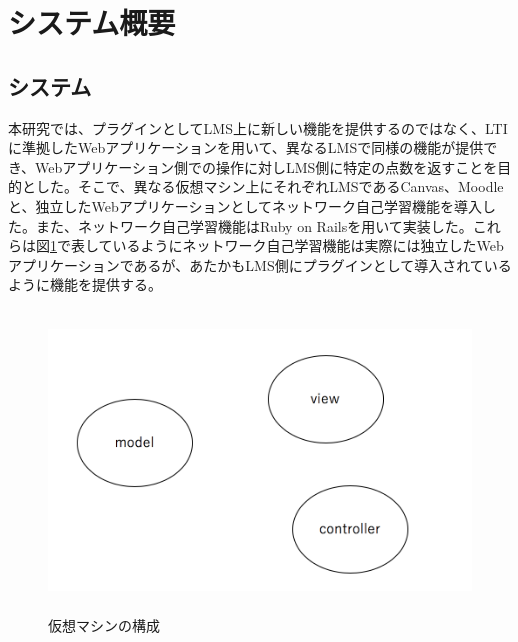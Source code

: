 \section{システム概要}
\subsection{システム}
\label{tag:function}
本研究では、プラグインとしてLMS上に新しい機能を提供するのではなく、LTIに準拠したWebアプリケーションを用いて、異なるLMSで同様の機能が提供でき、Webアプリケーション側での操作に対しLMS側に特定の点数を返すことを目的とした。そこで、異なる仮想マシン上にそれぞれLMSであるCanvas、Moodleと、独立したWebアプリケーションとしてネットワーク自己学習機能を導入した。また、ネットワーク自己学習機能はRuby on Railsを用いて実装した。これらは図\ref{fig:virtualMachine}で表しているようにネットワーク自己学習機能は実際には独立したWebアプリケーションであるが、あたかもLMS側にプラグインとして導入されているように機能を提供する。

\begin{figure}[htbp]
  \begin{center}
    \includegraphics[clip,width=12.0cm,height=8.0cm]{img/virtualMachine.png}
    \caption{仮想マシンの構成}
    \label{fig:virtualMachine}
  \end{center}
\end{figure}



